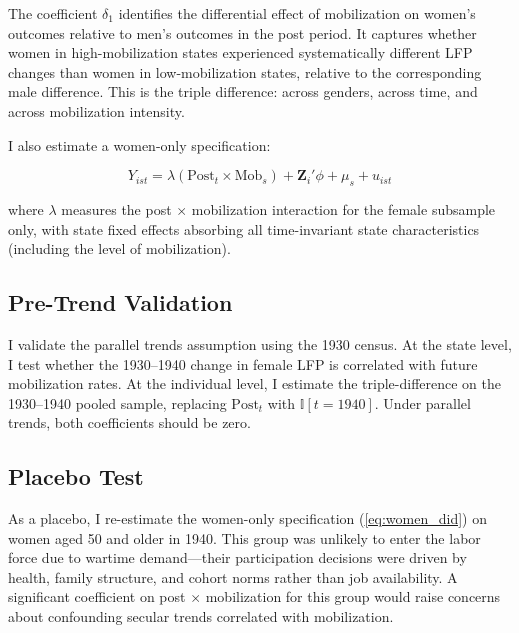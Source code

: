 \documentclass[12pt]{article}
\newcommand{\ind}{\mathbb{I}}
\begin{document}
The coefficient $\delta_1$ identifies the differential effect of mobilization on women's outcomes relative to men's outcomes in the post period. It captures whether women in high-mobilization states experienced systematically different LFP changes than women in low-mobilization states, relative to the corresponding male difference. This is the triple difference: across genders, across time, and across mobilization intensity.

I also estimate a women-only specification:

\begin{equation}
Y_{ist} = \lambda (\text{Post}_t \times \text{Mob}_s) + \mathbf{Z}_i' \phi + \mu_s + u_{ist}
\label{eq:women_did}
\end{equation}

\noindent where $\lambda$ measures the post $\times$ mobilization interaction for the female subsample only, with state fixed effects absorbing all time-invariant state characteristics (including the level of mobilization).

\subsection{Pre-Trend Validation}

I validate the parallel trends assumption using the 1930 census. At the state level, I test whether the 1930--1940 change in female LFP is correlated with future mobilization rates. At the individual level, I estimate the triple-difference on the 1930--1940 pooled sample, replacing $\text{Post}_t$ with $\ind[t = 1940]$. Under parallel trends, both coefficients should be zero.

\subsection{Placebo Test}

As a placebo, I re-estimate the women-only specification (\cref{eq:women_did}) on women aged 50 and older in 1940. This group was unlikely to enter the labor force due to wartime demand---their participation decisions were driven by health, family structure, and cohort norms rather than job availability. A significant coefficient on post $\times$ mobilization for this group would raise concerns about confounding secular trends correlated with mobilization.


\end{document}
